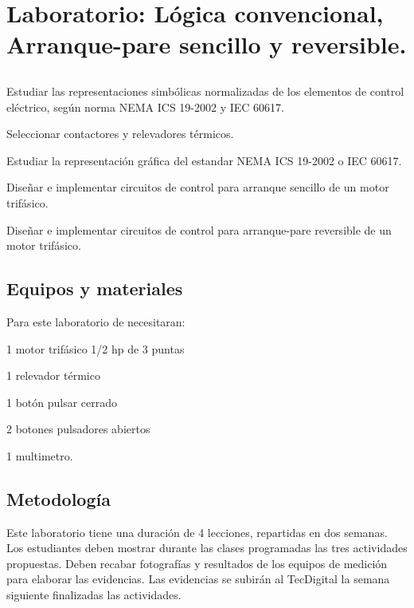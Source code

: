\chapter{Laboratorio: Lógica convencional, Arranque-pare sencillo y reversible.}


\section{\obj}
\capacidad
\begin{itemize}
	{\small
	 \item  Estudiar  las representaciones simbólicas normalizadas de los elementos de control eléctrico, según norma NEMA ICS 19-2002 y IEC 60617.
	 \item Seleccionar contactores y relevadores térmicos.
	 \item  Estudiar la representación gráfica del estandar NEMA ICS 19-2002 o IEC 60617. 
	 \item  Diseñar e implementar circuitos de control para arranque sencillo de un motor trifásico.
	 \item  Diseñar e implementar circuitos de control para arranque-pare reversible de un  motor trifásico.
 }
\end{itemize} 

 
\section{Equipos y materiales}
Para este laboratorio de necesitaran:
\begin{itemize}
	{\small \item 1 motor trifásico 1/2 hp de 3 puntas
	\item 1 relevador térmico
	\item 1 botón pulsar cerrado
	\item 2 botones pulsadores abiertos
	\item 1 multimetro.
}
\end{itemize}

\section{Metodología}

Este laboratorio tiene una duración de 4 lecciones, repartidas en dos semanas. Los estudiantes deben mostrar durante las clases programadas las tres actividades propuestas. Deben recabar fotografías y resultados de los equipos de medición para elaborar las evidencias. Las evidencias se subirán al TecDigital la semana siguiente finalizadas las actividades.

